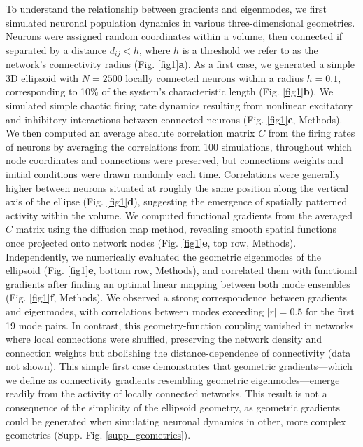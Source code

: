 \documentclass{article}
\begin{document}
To understand the relationship between gradients and eigenmodes, we first simulated neuronal population dynamics in various three-dimensional geometries. Neurons were assigned random coordinates within a volume, then connected if separated by a distance $d_{ij}<h$, where $h$ is a threshold we refer to as the network's connectivity radius (Fig. \ref{fig1}\textbf{a}). As a first case, we generated a simple 3D ellipsoid with $N=2500$ locally connected neurons within a radius $h=0.1$, corresponding to 10\% of the system’s characteristic length (Fig. \ref{fig1}\textbf{b}). We simulated simple chaotic firing rate dynamics resulting from nonlinear excitatory and inhibitory interactions between connected neurons (Fig. \ref{fig1}\textbf{c}, Methods). We then computed an average absolute correlation matrix $C$ from the firing rates of neurons by averaging the correlations from 100 simulations, throughout which node coordinates and connections were preserved, but connections weights and initial conditions were drawn randomly each time. Correlations were generally higher between neurons situated at roughly the same position along the vertical axis of the ellipse (Fig. \ref{fig1}\textbf{d}), suggesting the emergence of spatially patterned activity within the volume. We computed functional gradients from the averaged $C$ matrix using the diffusion map method\cite{Coifman2006}, revealing smooth spatial functions once projected onto network nodes (Fig. \ref{fig1}\textbf{e}, top row, Methods). Independently, we numerically evaluated the geometric eigenmodes of the ellipsoid (Fig. \ref{fig1}\textbf{e}, bottom row, Methods), and correlated them with functional gradients after finding an optimal linear mapping between both mode ensembles (Fig. \ref{fig1}\textbf{f}, Methods). We observed a strong correspondence between gradients and eigenmodes, with correlations between modes exceeding $|r|=0.5$ for the first 19 mode pairs. In contrast, this geometry-function coupling vanished in networks where local connections were shuffled, preserving the network density and connection weights but abolishing the distance-dependence of connectivity (data not shown). This simple first case demonstrates that geometric gradients---which we define as connectivity gradients resembling geometric eigenmodes---emerge readily from the activity of locally connected networks. This result is not a consequence of the simplicity of the ellipsoid geometry, as geometric gradients could be generated when simulating neuronal dynamics in other, more complex geometries (Supp. Fig. \ref{supp_geometries}). 
\end{document}
